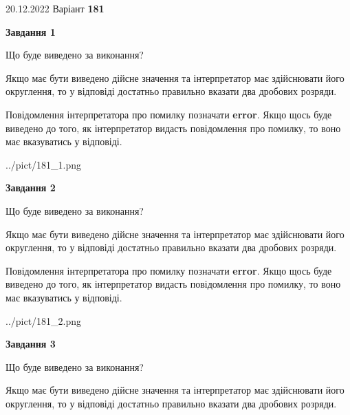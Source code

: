 \documentclass[12pt, ukrainian]{article}
\begin{document}
{20.12.2022 Варіант \No \textbf { 181 }\par}
{
\begin {Large}

{\begin {center}\textbf{Завдання 1}\end {center}}\par
Що буде виведено за виконання? \par

Якщо має бути виведено дійсне значення та інтерпретатор має здійснювати його округлення, 
то у відповіді достатньо правильно вказати два дробових розряди.

Повідомлення інтерпретатора про помилку позначати \textbf{error}.
Якщо щось буде виведено до того, як інтерпретатор видасть повідомлення про помилку, 
то воно має вказуватись у відповіді. \par

\begin{center}
	{../pict/181_1.png}
\end{center}
\newpage

{\begin {center}\textbf{Завдання 2}\end {center}}\par
Що буде виведено за виконання? \par

Якщо має бути виведено дійсне значення та інтерпретатор має здійснювати його округлення, 
то у відповіді достатньо правильно вказати два дробових розряди.

Повідомлення інтерпретатора про помилку позначати \textbf{error}.
Якщо щось буде виведено до того, як інтерпретатор видасть повідомлення про помилку, 
то воно має вказуватись у відповіді. \par

\begin{center}
	{../pict/181_2.png}
\end{center}
\newpage

{\begin {center}\textbf{Завдання 3}\end {center}}\par
Що буде виведено за виконання? \par

Якщо має бути виведено дійсне значення та інтерпретатор має здійснювати його округлення, 
то у відповіді достатньо правильно вказати два дробових розряди.


\end{Large}}
\end{document}
